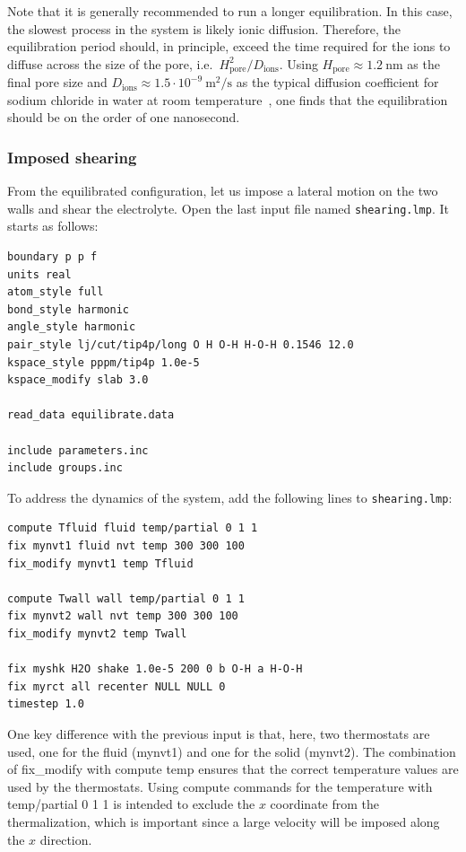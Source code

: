 \documentclass[9pt,tutorial]{livecoms}
\newcommand{\lmpcmd}[1]{\colorbox{listing}{\textcolor{command}{\small{#1}}}} %
\newcommand{\flecmd}[1]{\textcolor{command}{\texttt{#1}}} %
\begin{document}
\begin{note}
Note that it is generally recommended to run a longer equilibration.  In this case,
the slowest process in the system is likely ionic diffusion.
Therefore, the equilibration period should, in principle, exceed the time required
for the ions to diffuse across the size of the pore, i.e.~$H_\text{pore}^2/D_\text{ions}$.
Using $H_\text{pore} \approx 1.2~\text{nm}$ as the final pore size
and $D_\text{ions} \approx 1.5 \cdot 10^{-9}~\text{m}^2/\text{s}$
as the typical diffusion coefficient for sodium chloride in water at room
temperature~\cite{mills1955remeasurement}, one finds that the equilibration
should be on the order of one nanosecond.
\end{note}

\subsubsection{Imposed shearing}

From the equilibrated configuration, let us impose a lateral motion on the two
walls and shear the electrolyte.  Open the last input file named \flecmd{shearing.lmp}.
It starts {\color{blue}as follows}:
\begin{lstlisting}
boundary p p f
units real
atom_style full
bond_style harmonic
angle_style harmonic
pair_style lj/cut/tip4p/long O H O-H H-O-H 0.1546 12.0
kspace_style pppm/tip4p 1.0e-5
kspace_modify slab 3.0

read_data equilibrate.data

include parameters.inc
include groups.inc
\end{lstlisting}

To address the dynamics of the system, add the following lines to
\flecmd{shearing.lmp}:
\begin{lstlisting}
compute Tfluid fluid temp/partial 0 1 1
fix mynvt1 fluid nvt temp 300 300 100
fix_modify mynvt1 temp Tfluid

compute Twall wall temp/partial 0 1 1
fix mynvt2 wall nvt temp 300 300 100
fix_modify mynvt2 temp Twall

fix myshk H2O shake 1.0e-5 200 0 b O-H a H-O-H
fix myrct all recenter NULL NULL 0
timestep 1.0
\end{lstlisting}

One key difference with the previous input is that, here, two thermostats are used,
one for the fluid (\lmpcmd{mynvt1}) and one for the solid (\lmpcmd{mynvt2}).
The combination of \lmpcmd{fix\_modify} with \lmpcmd{compute temp} ensures
that the correct temperature values are used by the thermostats.  Using
\lmpcmd{compute} commands for the temperature with \lmpcmd{temp/partial 0 1 1} is
intended to exclude the $x$ coordinate from the thermalization, which is important since a
large velocity will be imposed along the $x$ direction.
\end{document}
